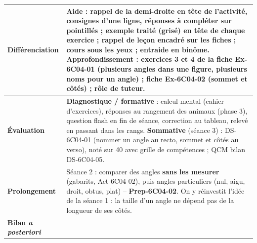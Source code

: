 \documentclass[11pt]{article}
\newcommand{\champ}[2]{\textbf{#1} & #2 \\ \hline}
\begin{document}
\newpage
\renewcommand{\arraystretch}{1.35}
\begin{tabularx}{\linewidth}{|>{\raggedright\arraybackslash}p{3.6cm}|X|}
\hline
\champ{Différenciation}{\textbf{Aide} : rappel de la demi-droite en tête de l'activité, consignes d'une ligne, réponses à compléter sur pointillés ; exemple traité (grisé) en tête de chaque exercice ; rappel de leçon encadré sur les fiches ; cours sous les yeux ; entraide en binôme.\newline
\textbf{Approfondissement} : exercices 3 et 4 de la fiche Ex-6C04-01 (plusieurs angles dans une figure, plusieurs noms pour un angle) ; fiche Ex-6C04-02 (sommet et côtés) ; rôle de tuteur.}
\champ{Évaluation}{\textbf{Diagnostique / formative} : calcul mental (cahier d'exercices), réponses au rangement des animaux (phase 3), question flash en fin de séance, correction au tableau, relevé en passant dans les rangs.\newline
\textbf{Sommative} (séance 3) : DS-6C04-01 (nommer un angle au recto, sommet et côtés au verso), noté sur 40 avec grille de compétences ; QCM bilan DS-6C04-05.}
\champ{Prolongement}{Séance 2 : comparer des angles \textbf{sans les mesurer} (gabarits, Act-6C04-02), puis angles particuliers (nul, aigu, droit, obtus, plat) -- \textbf{Prep-6C04-02}. On y réinvestit l'idée de la séance 1 : la taille d'un angle ne dépend pas de la longueur de ses côtés.}
\champ{Bilan \textit{a posteriori}}{\rule{0pt}{5cm}}
\end{tabularx}
\end{document}
